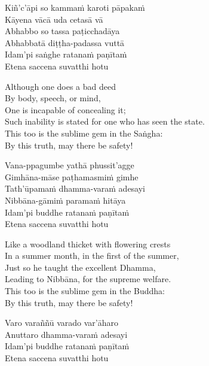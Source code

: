 \begin{pali-hang-continued}
  Kiñ'c'āpi so kammaṁ karoti pāpakaṁ\\
  Kāyena vācā uda cetasā vā\\
  Abhabbo so tassa paṭicchadāya\\
  Abhabbatā diṭṭha-padassa vuttā\\
  Idam'pi saṅghe ratanaṁ paṇītaṁ\\
  Etena saccena suvatthi hotu
\end{pali-hang-continued}

\ifninebythirteen\clearpage\fi

\begin{english-verses}
  Although one does a bad deed\\
  By body, speech, or mind,\\
  One is incapable of concealing it;\\
  Such inability is stated for one who has seen the state.\\
  This too is the sublime gem in the Saṅgha:\\
  \ifbfive\enlargethispage{1\baselineskip}\fi
  By this truth, may there be safety!
\end{english-verses}


\begin{pali-hang-continued}
  Vana-ppagumbe yathā phussit'agge\\
  Gimhāna-māse paṭhamasmiṁ gimhe\\
  Tath'ūpamaṁ dhamma-varaṁ adesayi\\
  Nibbāna-gāmiṁ paramaṁ hitāya\\
  Idam'pi buddhe ratanaṁ paṇītaṁ\\
  Etena saccena suvatthi hotu
\end{pali-hang-continued}

\begin{english-verses}
  Like a woodland thicket with flowering crests\\
  In a summer month, in the first of the summer,\\
  Just so he taught the excellent Dhamma,\\
  Leading to Nibbāna, for the supreme welfare.\\
  This too is the sublime gem in the Buddha:\\
  By this truth, may there be safety!
\end{english-verses}

\begin{pali-hang-continued}
  Varo varaññū varado var'āharo\\
  Anuttaro dhamma-varaṁ adesayi\\
  Idam'pi buddhe ratanaṁ paṇītaṁ\\
  Etena saccena suvatthi hotu
\end{pali-hang-continued}

